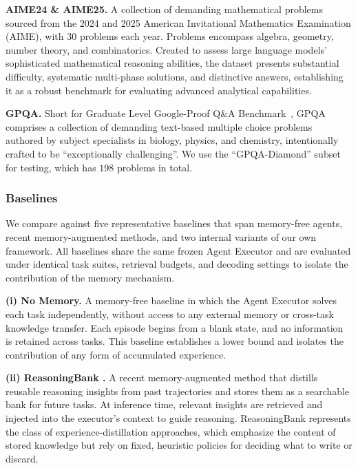 \noindent\textbf{AIME24 \& AIME25.} A collection of demanding mathematical problems
sourced from the 2024 and 2025 American Invitational Mathematics Examination (AIME), with 30 problems each year. Problems encompass algebra, geometry, number theory, and combinatorics. Created to assess large language models’ sophisticated mathematical reasoning abilities, the dataset presents substantial difficulty, systematic multi-phase solutions, and distinctive answers, establishing it as a robust benchmark for evaluating advanced analytical capabilities.

\noindent\textbf{GPQA.} Short for Graduate Level Google-Proof Q$\&$A Benchmark~\citep{rein2024gpqa}, GPQA comprises a collection of demanding text-based multiple choice problems authored by subject specialists in biology, physics, and chemistry, intentionally crafted to be ``exceptionally challenging''. We use the ``GPQA-Diamond'' subset for testing, which has $198$ problems in total. 

\subsubsection{Baselines}
We compare \ours{} against five representative baselines that span memory-free agents, recent memory-augmented methods, and two internal variants of our own framework. All baselines share the same frozen Agent Executor and are evaluated under identical task suites, retrieval budgets, and decoding settings to isolate the contribution of the memory mechanism.

\noindent\textbf{(i) No Memory.} A memory-free baseline in which the Agent Executor solves each task independently, without access to any external memory or cross-task knowledge transfer. Each episode begins from a blank state, and no information is retained across tasks. This baseline establishes a lower bound and isolates the contribution of any form of accumulated experience.

\noindent\textbf{(ii) ReasoningBank \citep{ouyang2026reasoningbank}.} A recent memory-augmented method that distills reusable reasoning insights from past trajectories and stores them as a searchable bank for future tasks. At inference time, relevant insights are retrieved and injected into the executor's context to guide reasoning. ReasoningBank represents the class of experience-distillation approaches, which emphasize the content of stored knowledge but rely on fixed, heuristic policies for deciding what to write or discard.

